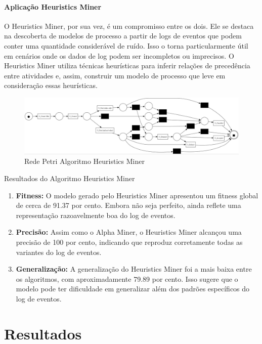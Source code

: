 \documentclass[tcc2]{classe_uftex/uftex}
\begin{document}
\subsubsection{Aplicação Heuristics Miner }
O Heuristics Miner, por sua vez, é um compromisso entre os dois. Ele se destaca na descoberta de modelos de processo a partir de logs de eventos que podem conter uma quantidade considerável de ruído. Isso o torna particularmente útil em cenários onde os dados de log podem ser incompletos ou imprecisos. O Heuristics Miner utiliza técnicas heurísticas para inferir relações de precedência entre atividades e, assim, construir um modelo de processo que leve em consideração essas heurísticas.

\begin{figure}[h]
    \centering
    \includegraphics[width=12cm]{tcc_example/Heuristics_miner.jpg}
    \caption{Rede Petri Algoritmo Heuristics Miner}
\end{figure}

Resultados do Algoritmo Heuristics Miner

\begin{enumerate}
    \item \textbf{Fitness:} O modelo gerado pelo Heuristics Miner apresentou um fitness global de cerca de 91.37 por cento. Embora não seja perfeito, ainda reflete uma representação razoavelmente boa do log de eventos.
    
        \item \textbf {Precisão:} Assim como o Alpha Miner, o Heuristics Miner alcançou uma precisão de 100 por cento, indicando que reproduz corretamente todas as variantes do log de eventos.
    
    \item \textbf{Generalização:} A generalização do Heuristics Miner foi a mais baixa entre os algoritmos, com aproximadamente 79.89 por cento. Isso sugere que o modelo pode ter dificuldade em generalizar além dos padrões específicos do log de eventos.

    
\end{enumerate}



\chapter{Resultados} 
\end{document}
